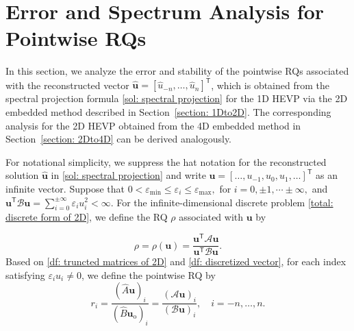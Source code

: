 \documentclass[11pt]{article}
\newcommand{\tr}{\textcolor{red}}
\def\u{\mathbf{u}}
\numberwithin{equation}{section}
\begin{document}

\section{Error and Spectrum Analysis for Pointwise  RQs} \label{section: Error analysis}

In this section, we analyze the error and stability of the pointwise RQs associated with the reconstructed vector $\widehat{\mathbf{u}}=[\widehat{u}_{-n},\ldots,\widehat{u}_{n}]^{\mathsf{T}}$, which is obtained from the spectral projection formula \eqref{sol: spectral projection} for the 1D HEVP via the 2D embedded method described in Section~\ref{section: 1Dto2D}. The corresponding analysis for the 2D HEVP obtained from the 4D embedded method in Section~\ref{section: 2Dto4D} can be derived analogously.

For notational simplicity, we suppress the hat notation for the reconstructed solution $\widehat{\boldsymbol{u}}$ in \eqref{sol: spectral projection}  and write $\boldsymbol{u} = [\dots, u_{-1}, u_0, u_1, \dots]^\mathsf{T}$ as an infinite vector. Suppose that $ 0 < \varepsilon_{\min} \le \varepsilon_i \le \varepsilon_{\max},$ for $i = 0, \pm1, \cdots \pm \infty,$ and $\boldsymbol{u}^\mathsf{T} \mathcal{B} \boldsymbol{u} = \sum_{i=0}^{\pm \infty} \varepsilon_i u_i^2 < \infty.$ For the infinite-dimensional discrete problem \eqref{total: discrete form of 2D}, we define the RQ $\rho$ associated with $\boldsymbol{u}$ by

\begin{equation} \label{def: Rayleigh quotient}
\rho = \rho(\boldsymbol{u}) = \frac{\boldsymbol{u}^\mathsf{T} \mathcal{A} \boldsymbol{u}}{\boldsymbol{u}^\mathsf{T} \mathcal{B} \boldsymbol{u}}.
\end{equation}
Based on  \eqref{df: truncted matrices of 2D} and \eqref{df: discretized vector}, for each index satisfying $\varepsilon_i u_i\neq0$, we define the pointwise RQ by
\begin{equation} \label{eq: pointwise ratio}
r_i = \frac{(\widehat{A}\u)_i}{(\widehat{B}\u_{\mathrm{o}})_i}
= \frac{(\mathcal{A}\boldsymbol{u})_i}{(\mathcal{B}\boldsymbol{u})_i},
\quad i = -n, \ldots, n.
\end{equation}
\end{document}
